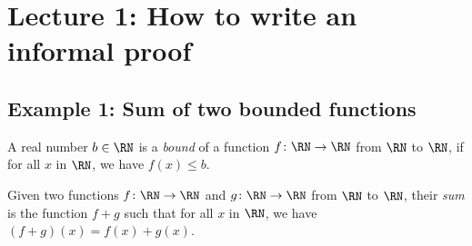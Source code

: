 

\section{Lecture 1: How to write an informal proof}

\subsection{Example 1: Sum of two bounded functions}

\begin{definition}
  A real number $b \in \RN$ is a \emph{bound} of a 
  function $f\colon \RN\to \RN$ from $\RN$ to $\RN$, if for all $x$ in 
  $\RN$, we have $f(x) \leq b$. 
\end{definition}


\begin{definition}
  Given two functions $f\colon  \RN\to \RN$ and $g\colon  \RN\to \RN$ from $\RN$ to $\RN$, their \emph{sum} is the function $f + g$ such 
  that for all $x$ in $\RN$, we have $(f+g) (x) = f(x) + g(x)$.
\end{definition} 


